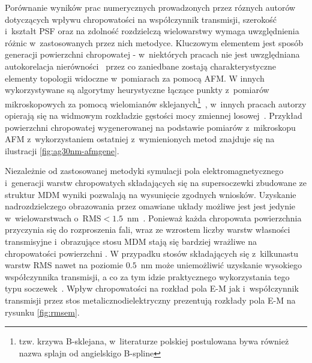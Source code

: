 Porównanie wyników prac numerycznych prowadzonych przez róznych autorów dotyczących wpływu chropowatości na współczynnik transmisji, szerokość i~kształt PSF oraz na zdolność rozdzielczą wielowarstwy wymaga uwzględnienia różnic w~zastosowanych przez nich metodyce. Kluczowym elementem jest sposób generacji powierzchni chropowatej - w~niektórych pracach nie jest uwzględniana autokorelacja nierówności~\cite{guo2014negative} przez co zaniedbane zostają charakterystyczne elementy topologii widoczne w~pomiarach za pomocą AFM. W innych wykorzystywane są algorytmy heurystyczne łączące punkty z~pomiarów mikroskopowych za pomocą wielomianów sklejanych\footnote{tzw. krzywa B-sklejana, w~literaturze polskiej postulowana bywa również nazwa splajn od angielskigo B-spline}~\cite{ludwig2012impact}, w~innych pracach autorzy opierają się na widmowym rozkładzie gęstości mocy zmiennej losowej~\cite{pastuszczak2013engineering}. Przykład powierzchni chropowatej wygenerowanej na podstawie pomiarów z~mikroskopu AFM z~wykorzystaniem ostatniej z~wymienionych metod znajduje się na ilustracji \ref{fig:ag30nm-afmgene}.

Niezależnie od zastosowanej metodyki symulacji pola elektromagnetycznego i~generacji warstw chropowatych składających się na supersoczewki zbudowane ze struktur MDM wyniki pozwalają na wysunięcie zgodnych wniosków. Uzyskanie nadrozdzielczego obrazowania przez omawiane układy  możliwe jest jest jedynie w~wielowarstwach o~RMS$<1.5$~nm~\citep{guo2014negative,stefaniuk2011effect,ludwig2012impact}. Ponieważ każda chropowata powierzchnia przyczynia się do rozproszenia fali, wraz ze wzrostem liczby warstw własności transmisyjne i~obrazujące stosu MDM stają się bardziej wrażliwe na chropowatości powierzchni \cite{guo2014negative}. W przypadku stosów składających się z~kilkunastu warstw RMS nawet na poziomie $0.5$~nm może uniemożliwić uzyskanie wysokiego współczynnika transmisji, a co za tym idzie praktycznego wykorzystania tego typu soczewek~\cite{pastuszczak2013engineering}. Wpływ chropowatości na rozkład pola E-M jak i~współczynnik transmisji przez stos metalicznodielektryczny prezentują rozkłady pola E-M na rysunku \ref{fig:rmsem}.








